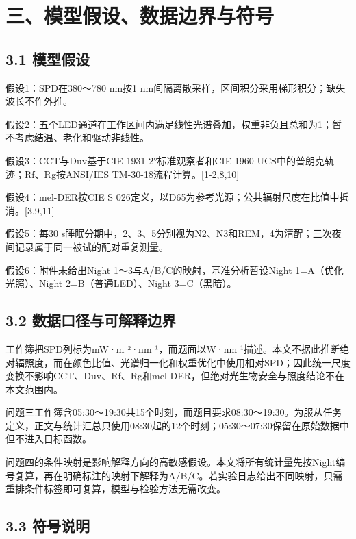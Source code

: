 \documentclass[UTF8,a4paper,12pt]{ctexart}
\begin{document}
\section{三、模型假设、数据边界与符号}

\subsection{3.1 模型假设}

假设1：SPD在380～780 nm按1 nm间隔离散采样，区间积分采用梯形积分；缺失波长不作外推。

假设2：五个LED通道在工作区间内满足线性光谱叠加，权重非负且总和为1；暂不考虑结温、老化和驱动非线性。

假设3：CCT与Duv基于CIE 1931 2°标准观察者和CIE 1960 UCS中的普朗克轨迹；Rf、Rg按ANSI/IES TM-30-18流程计算。[1-2,8,10]

假设4：mel-DER按CIE S 026定义，以D65为参考光源；公共辐射尺度在比值中抵消。[3,9,11]

假设5：每30 s睡眠分期中，2、3、5分别视为N2、N3和REM，4为清醒；三次夜间记录属于同一被试的配对重复测量。

假设6：附件未给出Night 1～3与A/B/C的映射，基准分析暂设Night 1=A（优化光照）、Night 2=B（普通LED）、Night 3=C（黑暗）。

\subsection{3.2 数据口径与可解释边界}

工作簿把SPD列标为mW·m⁻²·nm⁻¹，而题面以W·nm⁻¹描述。本文不据此推断绝对辐照度，而在颜色比值、光谱归一化和权重优化中使用相对SPD；因此统一尺度变换不影响CCT、Duv、Rf、Rg和mel-DER，但绝对光生物安全与照度结论不在本文范围内。

问题三工作簿含05:30～19:30共15个时刻，而题目要求08:30～19:30。为服从任务定义，正文与统计汇总只使用08:30起的12个时刻；05:30～07:30保留在原始数据中但不进入目标函数。

问题四的条件映射是影响解释方向的高敏感假设。本文将所有统计量先按Night编号复算，再在明确标注的映射下解释为A/B/C。若实验日志给出不同映射，只需重排条件标签即可复算，模型与检验方法无需改变。

\subsection{3.3 符号说明}
\end{document}
